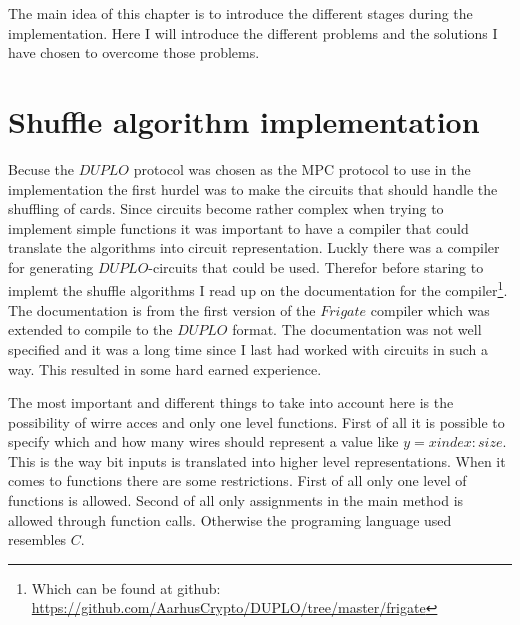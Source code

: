 The main idea of this chapter is to introduce the different stages during the implementation. Here I will introduce the different problems and the solutions I have chosen to overcome those problems.


\section{Shuffle algorithm implementation}


Becuse the $DUPLO$ protocol was chosen as the MPC protocol to use in the implementation the first hurdel was to make the circuits that should handle the shuffling of cards. Since circuits become rather complex when trying to implement simple functions it was important to have a compiler that could translate the algorithms into circuit representation. Luckly there was a compiler for generating $DUPLO$-circuits that could be used. Therefor before staring to implemt the shuffle algorithms I read up on the documentation for the compiler\footnote{Which can be found at github: \url{https://github.com/AarhusCrypto/DUPLO/tree/master/frigate}}. The documentation is from the first version of the $Frigate$ compiler which was extended to compile to the $DUPLO$ format. The documentation was not well specified and it was a long time since I last had worked with circuits in such a way. This resulted in some hard earned experience.

The most important and different things to take into account here is the possibility of wirre acces and only one level functions. First of all it is possible to specify which and how many wires should represent a value like $y=x{index:size}$. This is the way bit inputs is translated into higher level representations. When it comes to functions there are some restrictions. First of all only one level of functions is allowed. Second of all only assignments in the main method is allowed through function calls. Otherwise the programing language used resembles $C$.


